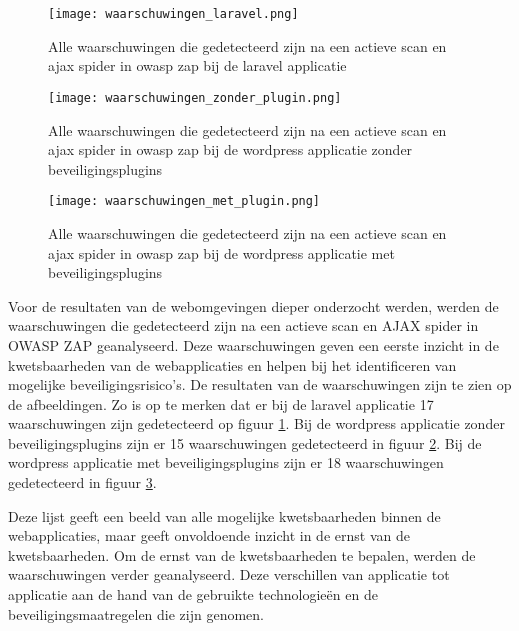 \begin{figure}
    \centering
    \texttt{[image: waarschuwingen\_laravel.png]}
    \caption[Alle waarschuwingen die gedetecteerd zijn na een actieve scan en ajax spider in owasp zap bij de laravel applicatie]
    {Alle waarschuwingen die gedetecteerd zijn na een actieve scan en ajax spider in owasp zap bij de laravel applicatie}
    \label{fig:waarschuwingen_laravel}
\end{figure}
\begin{figure}
    \centering
    \texttt{[image: waarschuwingen\_zonder\_plugin.png]}
    \caption[Alle waarschuwingen die gedetecteerd zijn na een actieve scan en ajax spider in owasp zap bij de wordpress applicatie zonder beveiligingsplugins]
    {Alle waarschuwingen die gedetecteerd zijn na een actieve scan en ajax spider in owasp zap bij de wordpress applicatie zonder beveiligingsplugins}
    \label{fig:waarschuwingen_zonder}
\end{figure}
\begin{figure}
    \centering
    \texttt{[image: waarschuwingen\_met\_plugin.png]}
    \caption[Alle waarschuwingen die gedetecteerd zijn na een actieve scan en ajax spider in owasp zap bij de wordpress applicatie met beveiligingsplugins]
    {Alle waarschuwingen die gedetecteerd zijn na een actieve scan en ajax spider in owasp zap bij de wordpress applicatie met beveiligingsplugins}
    \label{fig:waarschuwingen_met}
\end{figure}

Voor de resultaten van de webomgevingen dieper onderzocht werden, werden de waarschuwingen die gedetecteerd zijn na een actieve scan en AJAX spider in OWASP ZAP 
geanalyseerd. Deze waarschuwingen geven een eerste inzicht in de kwetsbaarheden van de webapplicaties en helpen bij het identificeren van 
mogelijke beveiligingsrisico's. De resultaten van de waarschuwingen zijn te zien op de afbeeldingen. Zo is op te merken dat er bij de 
laravel applicatie 17 waarschuwingen zijn gedetecteerd op figuur \ref{fig:waarschuwingen_laravel}. Bij de wordpress applicatie zonder 
beveiligingsplugins zijn er 15 waarschuwingen gedetecteerd in figuur \ref{fig:waarschuwingen_zonder}. Bij de wordpress 
applicatie met beveiligingsplugins zijn er 18 waarschuwingen gedetecteerd in figuur \ref{fig:waarschuwingen_met}.

Deze lijst geeft een beeld van alle mogelijke kwetsbaarheden binnen de webapplicaties, maar geeft onvoldoende inzicht in de 
ernst van de kwetsbaarheden. Om de ernst van de kwetsbaarheden te bepalen, werden de waarschuwingen verder geanalyseerd. 
Deze verschillen van applicatie tot applicatie aan de hand van de gebruikte technologieën en de 
beveiligingsmaatregelen die zijn genomen.

